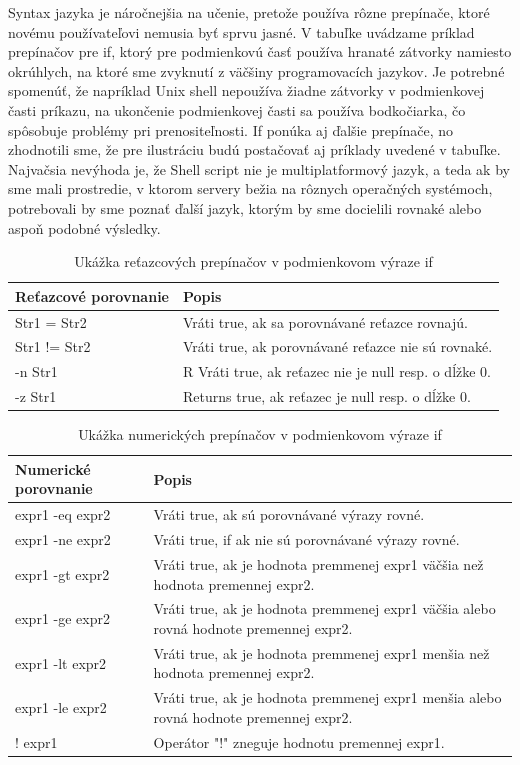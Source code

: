 Syntax jazyka je náročnejšia na učenie, pretože používa rôzne prepínače, ktoré novému používateľovi nemusia byť sprvu jasné. 
V tabuľke uvádzame príklad prepínačov pre if, ktorý pre podmienkovú časť používa hranaté zátvorky namiesto okrúhlych, na ktoré sme zvyknutí z väčšiny programovacích jazykov. Je potrebné spomenúť, že napríklad Unix shell nepoužíva žiadne zátvorky v podmienkovej časti príkazu, na ukončenie podmienkovej časti sa používa bodkočiarka, čo spôsobuje problémy pri prenositeľnosti. If ponúka aj ďalšie prepínače, no zhodnotili sme, že pre ilustráciu budú postačovať aj príklady uvedené v tabuľke.
Najvačsia nevýhoda je, že Shell script nie je multiplatformový jazyk, a teda ak by sme mali prostredie, v ktorom servery bežia na rôznych operačných systémoch, potrebovali by sme poznať ďalší jazyk, ktorým by sme docielili rovnaké alebo aspoň podobné výsledky.
\newline
\begin{table}[h!]
	\centering
	\begin{tabular}{|p{4cm}|p{13cm}|}
		\hline
		Reťazcové porovnanie & Popis \\
		\hline
		Str1 = Str2	& Vráti true, ak sa porovnávané reťazce rovnajú. \\ 
		\hline
		Str1 != Str2 &	Vráti true, ak porovnávané reťazce nie sú rovnaké.\\ 
		\hline
		-n Str1	 &R Vráti true, ak reťazec nie je null resp. o dĺžke 0.\\ 
		\hline
		-z Str1	& Returns true, ak reťazec je null resp. o dĺžke 0.\\
		\hline
	\end{tabular}
	\caption{Ukážka reťazcových prepínačov v podmienkovom výraze if \cite{shellprep}}
	\label{table:1}
	
\end{table}
\begin{table}[h!]
	\centering
	\begin{tabular}{|p{4cm}|p{13cm}|}
		\hline
		Numerické porovnanie	& Popis \\
		\hline
		expr1 -eq expr2	& Vráti true, ak sú porovnávané výrazy rovné. \\
		\hline
		expr1 -ne expr2	& Vráti true, if ak nie sú porovnávané výrazy rovné. \\
		\hline
		expr1 -gt expr2	& Vráti true, ak je hodnota premmenej expr1 väčšia než hodnota premennej expr2. \\
		\hline
		expr1 -ge expr2	& Vráti true, ak je hodnota premmenej expr1 väčšia alebo rovná hodnote premennej expr2. \\
		\hline
		expr1 -lt expr2	& Vráti true, ak je hodnota premmenej expr1 menšia než hodnota premennej  expr2. \\
		\hline
		expr1 -le expr2	& Vráti true, ak je hodnota premmenej expr1 menšia alebo rovná hodnote premennej expr2. \\
		\hline
		! expr1	& Operátor "!" zneguje hodnotu premennej expr1. \\
		\hline
	\end{tabular}
	\caption{Ukážka numerických prepínačov v podmienkovom výraze if \cite{shellprep}}
	\label{table:1}
	
\end{table}
\newpage

